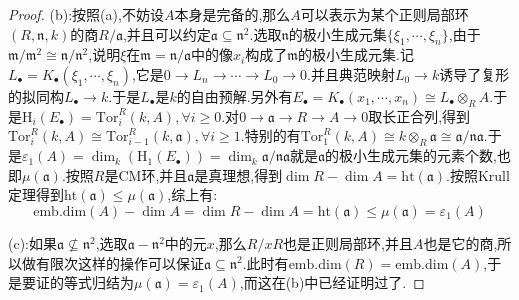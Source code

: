 \begin{enumerate}
\begin{proof}
    	(b):按照(a),不妨设$A$本身是完备的,那么$A$可以表示为某个正则局部环$(R,\mathfrak{n},k)$的商$R/\mathfrak{a}$,并且可以约定$\mathfrak{a}\subseteq\mathfrak{n}^2$.选取$\mathfrak{n}$的极小生成元集$\{\xi_1,\cdots,\xi_n\}$,由于$\mathfrak{m}/\mathfrak{m}^2\cong\mathfrak{n}/\mathfrak{n}^2$,说明$\xi$在$\mathfrak{m}=\mathfrak{n}/\mathfrak{a}$中的像$x_i$构成了$\mathfrak{m}$的极小生成元集.记$L_{\bullet}=K_{\bullet}(\xi_1,\cdots,\xi_n)$,它是$0\to L_n\to\cdots\to L_0\to0$.并且典范映射$L_0\to k$诱导了复形的拟同构$L_{\bullet}\to k$.于是$L_{\bullet}$是$k$的自由预解.另外有$E_{\bullet}=K_{\bullet}(x_1,\cdots,x_n)\cong L_{\bullet}\otimes_RA$.于是$\mathrm{H}_i(E_{\bullet})=\mathrm{Tor}_i^R(k,A),\forall i\ge0$.对$0\to\mathfrak{a}\to R\to A\to0$取长正合列,得到$\mathrm{Tor}_i^R(k,A)\cong\mathrm{Tor}_{i-1}^R(k,\mathfrak{a}),\forall i\ge1$.特别的有$\mathrm{Tor}_1^R(k,A)\cong k\otimes_R\mathfrak{a}\cong\mathfrak{a}/\mathfrak{n}\mathfrak{a}$.于是$\varepsilon_1(A)=\dim_k(\mathrm{H}_1(E_{\bullet}))=\dim_k\mathfrak{a}/\mathfrak{n}\mathfrak{a}$就是$\mathfrak{a}$的极小生成元集的元素个数,也即$\mu(\mathfrak{a})$.按照$R$是CM环,并且$\mathfrak{a}$是真理想,得到$\dim R-\dim A=\mathrm{ht}(\mathfrak{a})$.按照Krull定理得到$\mathrm{ht}(\mathfrak{a})\le\mu(\mathfrak{a})$,综上有:
    	$$\mathrm{emb.dim}(A)-\dim A=\dim R-\dim A=\mathrm{ht}(\mathfrak{a})\le\mu(\mathfrak{a})=\varepsilon_1(A)$$
    	
    	(c):如果$\mathfrak{a}\not\subseteq\mathfrak{n}^2$,选取$\mathfrak{a}-\mathfrak{n}^2$中的元$x$,那么$R/xR$也是正则局部环,并且$A$也是它的商,所以做有限次这样的操作可以保证$\mathfrak{a}\subseteq\mathfrak{n}^2$.此时有$\mathrm{emb.dim}(R)=\mathrm{emb.dim}(A)$,于是要证的等式归结为$\mu(\mathfrak{a})=\varepsilon_1(A)$,而这在(b)中已经证明过了.
    \end{proof}
\end{enumerate}

